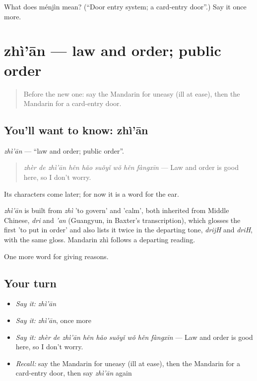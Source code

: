 \begin{tcolorbox}[breakable,colback=teal!4,colframe=teal!35!black,title={Before you move on}]
What does ménjìn mean? (\textquotedblleft{}Door entry system; a card-entry door\textquotedblright{}.) Say it once more.
\end{tcolorbox}
\section[zhì'ān]{zhì'ān — law and order; public order}

\label{lesson:ZH-C379-zhian}



\begin{quote}
Before the new one: say the Mandarin for uneasy (ill at ease), then the Mandarin for a card-entry door.
\end{quote}

\subsection*{You'll want to know: zhì'ān}
\emph{zhì'ān} — \textquotedblleft{}law and order; public order\textquotedblright{}.

\begin{quote}
\emph{zhèr de zhì'ān hěn hǎo suǒyǐ wǒ hěn fàngxīn} — Law and order is good here, so I don't worry.
\end{quote}

Its characters come later; for now it is a word for the ear.

\begin{cousinweb}
\emph{zhì'ān} is built from \emph{zhì} 'to govern' and  'calm', both inherited from Middle Chinese, \emph{dri} and \emph{'an} (Guangyun, in Baxter's transcription), which glosses the first 'to put in order' and also lists it twice in the departing tone, \emph{drijH} and \emph{driH}, with the same gloss. Mandarin zhì follows a departing reading.
\end{cousinweb}

\begin{grammarlens}[title={What you've built}]
One more word for giving reasons.
\end{grammarlens}

\subsection*{Your turn}
\begin{itemize}
\raggedright
  \item \emph{Say it:} \emph{zhì'ān}
  \item \emph{Say it:} \emph{zhì'ān}, once more
  \item \emph{Say it:} \emph{zhèr de zhì'ān hěn hǎo suǒyǐ wǒ hěn fàngxīn} — Law and order is good here, so I don't worry.
  \item \emph{Recall:} say the Mandarin for uneasy (ill at ease), then the Mandarin for a card-entry door, then say \emph{zhì'ān} again
\end{itemize}

